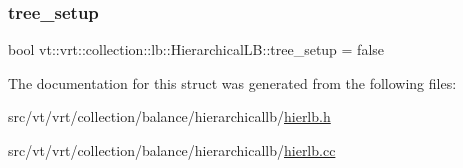 \subsubsection{\texorpdfstring{tree\+\_\+setup}{tree\_setup}}
{\footnotesize\ttfamily bool vt\+::vrt\+::collection\+::lb\+::\+Hierarchical\+L\+B\+::tree\+\_\+setup = false\hspace{0.3cm}{\ttfamily [private]}}



The documentation for this struct was generated from the following files\+:\begin{DoxyCompactItemize}
\item 
src/vt/vrt/collection/balance/hierarchicallb/\hyperlink{hierlb_8h}{hierlb.\+h}\item 
src/vt/vrt/collection/balance/hierarchicallb/\hyperlink{hierlb_8cc}{hierlb.\+cc}\end{DoxyCompactItemize}
